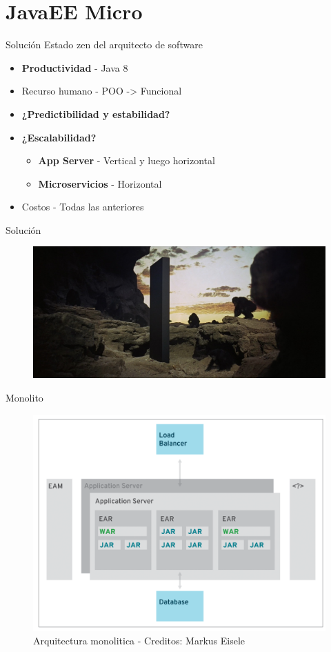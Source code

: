 \documentclass{beamer}
\begin{document}
\section{JavaEE Micro}

\begin{frame}{Solución}
Estado zen del arquitecto de software
\begin{itemize}
	\item \textbf{Productividad} - Java 8
	\item Recurso humano - POO -> Funcional
	\item \textbf{¿Predictibilidad y estabilidad?}
	\item \textbf{¿Escalabilidad?}
	\begin{itemize}
		\item \textbf{App Server} - Vertical y luego horizontal
		\item \textbf{Microservicios} - Horizontal
	\end{itemize}
	\item Costos - Todas las anteriores
\end{itemize}
\end{frame}

\begin{frame}{Solución}
\begin{figure}
	\centering
	\includegraphics[width=\linewidth]{Images/monolith}
\end{figure}
\end{frame}

\begin{frame}{Monolito}
\begin{figure}
	\centering
	\includegraphics[width=0.7\linewidth]{Images/monolitos}
	\caption{Arquitectura monolitica - Creditos: Markus Eisele}
\end{figure}
\end{frame}
\end{document}
